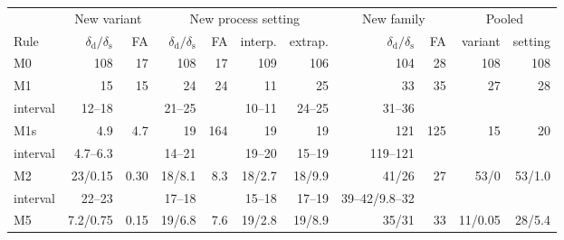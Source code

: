 \documentclass[pdflatex,sn-basic,lineno]{sn-jnl}
\providecommand{\DIFaddbeginFL}{} %
\providecommand{\DIFdelendFL}{} %
\newcommand{\DIFaddincludegraphics}[2][]{{\color{blue}\fbox{\DIFOincludegraphics[#1]{#2}}}} %
\DeclareRobustCommand{\DIFaddbeginFL}{\DIFOaddbeginFL \let\includegraphics\DIFaddincludegraphics} %
\DeclareRobustCommand{\DIFdelendFL}{\DIFOaddendFL \let\includegraphics\DIFOincludegraphics} %
\begin{document}
\begin{table}[t]
\DIFdelendFL \DIFaddbeginFL \begin{tabular}{@{}lrrrrrrrrrr@{}}
\toprule
 & \multicolumn{2}{c}{New variant} & \multicolumn{4}{c}{New process setting} & \multicolumn{2}{c}{New family} & \multicolumn{2}{c}{Pooled} \\
\cmidrule(lr){2-3}\cmidrule(lr){4-7}\cmidrule(lr){8-9}\cmidrule(lr){10-11}
Rule & $\delta_\mathrm{d}/\delta_\mathrm{s}$ & FA & $\delta_\mathrm{d}/\delta_\mathrm{s}$ & FA & interp. & extrap. & $\delta_\mathrm{d}/\delta_\mathrm{s}$ & FA & variant & setting \\
\midrule
M0 & 108 & 17 & 108 & 17 & 109 & 106 & 104 & 28 & 108 & 108 \\
M1 & 15 & 15 & 24 & 24 & 11 & 25 & 33 & 35 & 27 & 28 \\
\quad interval & 12--18 &  & 21--25 &  & 10--11 & 24--25 & 31--36 &  &  & \\
M1s & 4.9 & 4.7 & 19 & 164 & 19 & 19 & 121 & 125 & 15 & 20 \\
\quad interval & 4.7--6.3 &  & 14--21 &  & 19--20 & 15--19 & 119--121 &  &  & \\
M2 & 23/0.15 & 0.30 & 18/8.1 & 8.3 & 18/2.7 & 18/9.9 & 41/26 & 27 & 53/0 & 53/1.0 \\
\quad interval & 22--23 &  & 17--18 &  & 15--18 & 17--19 & 39--42/9.8--32 &  &  & \\
M5 & 7.2/0.75 & 0.15 & 19/6.8 & 7.6 & 19/2.8 & 19/8.9 & 35/31 & 33 & 11/0.05 & 28/5.4 \\

\end{tabular}
\end{table}
\end{document}
